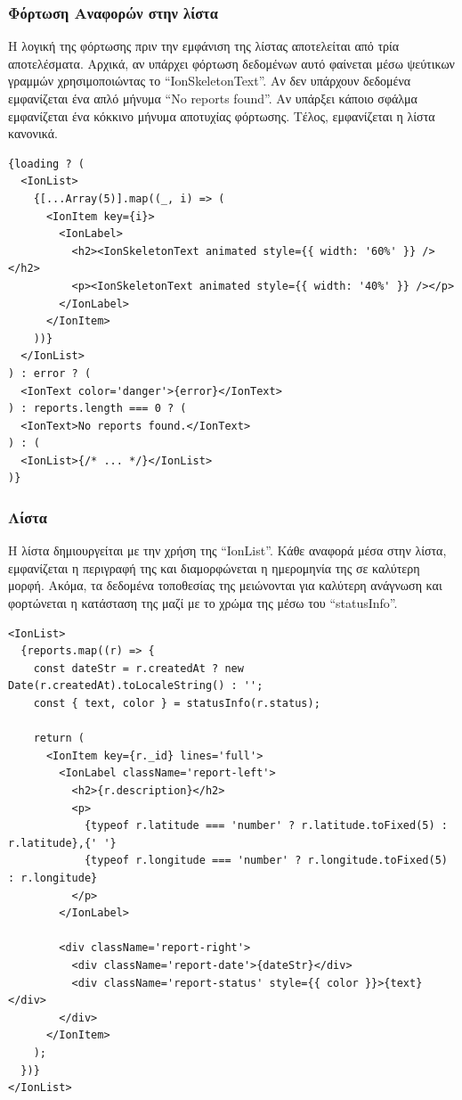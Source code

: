 \subsubsection*{Φόρτωση Αναφορών στην λίστα}
Η λογική της φόρτωσης πριν την εμφάνιση της λίστας αποτελείται από τρία αποτελέσματα. Αρχικά, αν υπάρχει φόρτωση δεδομένων αυτό φαίνεται μέσω ψεύτικων γραμμών χρησιμοποιώντας το “IonSkeletonText”. Αν δεν υπάρχουν δεδομένα εμφανίζεται ένα απλό μήνυμα “No reports found”. Αν υπάρξει κάποιο σφάλμα εμφανίζεται ένα κόκκινο μήνυμα αποτυχίας φόρτωσης. Τέλος, εμφανίζεται η λίστα κανονικά.
\\
\begin{lstlisting}
{loading ? (
  <IonList>
    {[...Array(5)].map((_, i) => (
      <IonItem key={i}>
        <IonLabel>
          <h2><IonSkeletonText animated style={{ width: '60%' }} /></h2>
          <p><IonSkeletonText animated style={{ width: '40%' }} /></p>
        </IonLabel>
      </IonItem>
    ))}
  </IonList>
) : error ? (
  <IonText color='danger'>{error}</IonText>
) : reports.length === 0 ? (
  <IonText>No reports found.</IonText>
) : (
  <IonList>{/* ... */}</IonList>
)}
\end{lstlisting}

\subsubsection*{Λίστα}
Η λίστα δημιουργείται με την χρήση της “IonList”. Κάθε αναφορά μέσα στην λίστα, εμφανίζεται η περιγραφή της και διαμορφώνεται η ημερομηνία της σε καλύτερη μορφή. Ακόμα, τα δεδομένα τοποθεσίας της μειώνονται για καλύτερη ανάγνωση και φορτώνεται η κατάσταση της μαζί με το χρώμα της μέσω του “statusInfo”.
\\
\begin{lstlisting}
<IonList>
  {reports.map((r) => {
    const dateStr = r.createdAt ? new Date(r.createdAt).toLocaleString() : '';
    const { text, color } = statusInfo(r.status);

    return (
      <IonItem key={r._id} lines='full'>
        <IonLabel className='report-left'>
          <h2>{r.description}</h2>
          <p>
            {typeof r.latitude === 'number' ? r.latitude.toFixed(5) : r.latitude},{' '}
            {typeof r.longitude === 'number' ? r.longitude.toFixed(5) : r.longitude}
          </p>
        </IonLabel>

        <div className='report-right'>
          <div className='report-date'>{dateStr}</div>
          <div className='report-status' style={{ color }}>{text}</div>
        </div>
      </IonItem>
    );
  })}
</IonList>
\end{lstlisting}


